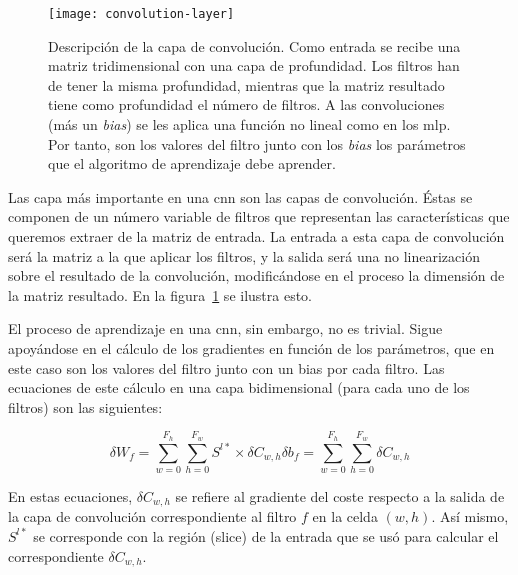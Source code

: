 \begin{figure}[!b]
	\centering
	\texttt{[image: convolution-layer]}
	\caption[Descripción de la capa de convolución]{Descripción de la capa de convolución. Como entrada se recibe una matriz tridimensional con una capa de profundidad. Los filtros han de tener la misma profundidad, mientras que la matriz resultado tiene como profundidad el número de filtros. A las convoluciones (más un \textit{bias}) se les aplica una función no lineal como en los \ac{mlp}. Por tanto, son los valores del filtro junto con los \textit{bias} los parámetros que el algoritmo de aprendizaje debe aprender.}
	\label{fig:cnn-convolution-layer}
\end{figure}

Las capa más importante en una \acrshort{cnn} son las capas de convolución. Éstas se componen de un número variable de filtros que representan las características que queremos extraer de la matriz de entrada. La entrada a esta capa de convolución será la matriz a la que aplicar los filtros, y la salida será una no linearización sobre el resultado de la convolución, modificándose en el proceso la dimensión de la matriz resultado. En la figura~\ref{fig:cnn-convolution-layer} se ilustra esto.

El proceso de aprendizaje en una \acrlong{cnn}, sin embargo, no es trivial. Sigue apoyándose en el cálculo de los gradientes en función de los parámetros, que en este caso son los valores del filtro junto con un bias por cada filtro. Las ecuaciones de este cálculo en una capa bidimensional (para cada uno de los filtros) son las siguientes:

\begin{subequations}
	\begin{equation}
		\delta W_f = \sum_{w=0}^{F_h} \sum_{h=0}^{F_w} S^{l*} \times \delta C_{w,h} \label{eq:cnn-error-weights}
	\end{equation}
	\begin{equation}
		\delta b_f = \sum_{w=0}^{F_h} \sum_{h=0}^{F_w} \delta C_{w,h} \label{eq:cnn-error-biases}
	\end{equation}
\end{subequations}

En estas ecuaciones, $\delta C_{w,h}$ se refiere al gradiente del coste respecto a la salida de la capa de convolución correspondiente al filtro $f$ en la celda $(w, h)$. Así mismo, $S^{l*}$ se corresponde con la región (slice) de la entrada que se usó para calcular el correspondiente $\delta C_{w,h}$.

